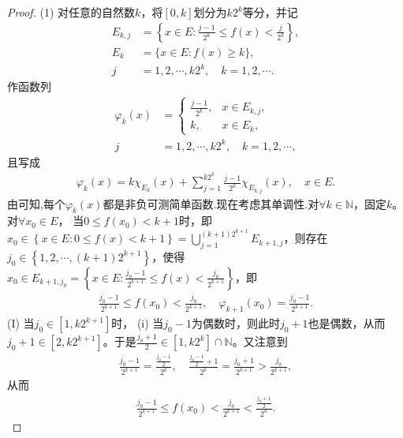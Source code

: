 \documentclass[../../main.tex]{subfiles}
\begin{document}
\begin{proof}
(1) 对任意的自然数$k$，将$[0, k]$划分为$k2^k$等分，并记
\begin{align*}
E_{k, j} &= \left\{x \in E: \frac{j - 1}{2^k} \leqslant f(x) < \frac{j}{2^k} \right\}, \\
E_{k} &= \{x \in E: f(x) \geqslant k\}, \\
j &= 1, 2, \cdots, k2^k, \quad k = 1, 2, \cdots.
\end{align*}
作函数列
\begin{align*}
\varphi_k(x) &= 
\begin{cases}
\frac{j - 1}{2^k}, & x \in E_{k, j}, \\
k, & x \in E_{k},
\end{cases} \\
j &= 1, 2, \cdots, k2^k, \quad k = 1, 2, \cdots,
\end{align*}
且写成
\begin{align*}
\varphi_k(x) = k\chi_{E_{k}}(x) + \sum_{j = 1}^{k2^k} \frac{j - 1}{2^k} \chi_{E_{k, j}}(x), \quad x \in E.
\end{align*}
由可知,每个$\varphi_k(x)$都是非负可测简单函数.现在考虑其单调性.对$\forall k\in \mathbb{N}$，固定$k$。对$\forall x_0\in E$，
\one 当$0\leqslant f\left( x_0 \right) <k + 1$时，即$x_0\in \left\{ x\in E:0\leqslant f\left( x \right) <k + 1 \right\} =\bigcup_{j = 1}^{(k + 1)2^{k + 1}}E_{k + 1,j}$，则存在$j_0\in \left\{ 1,2,\cdots,(k + 1)2^{k + 1} \right\}$，使得$x_0\in E_{k + 1,j_0}=\left\{ x\in E:\frac{j_0 - 1}{2^{k + 1}}\leqslant f\left( x \right) <\frac{j_0}{2^{k + 1}} \right\}$，即
\begin{align}
\frac{j_0 - 1}{2^{k + 1}}\leqslant f\left( x_0 \right) <\frac{j_0}{2^{k + 1}}, \quad \varphi _{k + 1}\left( x_0 \right) =\frac{j_0 - 1}{2^{k + 1}}. \label{eq:100.61}
\end{align}
(I) 当$j_0\in \left[ 1,k2^{k + 1} \right]$时，
(i) 当$j_0 - 1$为偶数时，则此时$j_0 + 1$也是偶数，从而$j_0 + 1\in \left[ 2,k2^{k + 1} \right]$。于是$\frac{j_0 + 1}{2}\in \left[ 1,k2^k \right] \cap \mathbb{N}$。又注意到
\begin{align*}
\frac{j_0 - 1}{2^{k + 1}}=\frac{\frac{j_0 - 1}{2}}{2^k}, \quad \frac{\frac{j_0 - 1}{2}+1}{2^k}=\frac{j_0 + 1}{2^{k + 1}}>\frac{j_0}{2^{k + 1}},
\end{align*}
从而
\begin{align*}
\frac{j_0 - 1}{2^{k + 1}}\leqslant f\left( x_0 \right) <\frac{j_0}{2^{k + 1}}<\frac{\frac{j_0 + 1}{2}}{2^k}.
\end{align*}

\end{proof}
\end{document}
